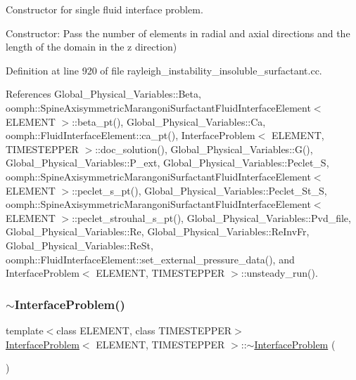 Constructor for single fluid interface problem. 

Constructor\+: Pass the number of elements in radial and axial directions and the length of the domain in the z direction) 

Definition at line 920 of file rayleigh\+\_\+instability\+\_\+insoluble\+\_\+surfactant.\+cc.



References Global\+\_\+\+Physical\+\_\+\+Variables\+::\+Beta, oomph\+::\+Spine\+Axisymmetric\+Marangoni\+Surfactant\+Fluid\+Interface\+Element$<$ E\+L\+E\+M\+E\+N\+T $>$\+::beta\+\_\+pt(), Global\+\_\+\+Physical\+\_\+\+Variables\+::\+Ca, oomph\+::\+Fluid\+Interface\+Element\+::ca\+\_\+pt(), Interface\+Problem$<$ E\+L\+E\+M\+E\+N\+T, T\+I\+M\+E\+S\+T\+E\+P\+P\+E\+R $>$\+::doc\+\_\+solution(), Global\+\_\+\+Physical\+\_\+\+Variables\+::\+G(), Global\+\_\+\+Physical\+\_\+\+Variables\+::\+P\+\_\+ext, Global\+\_\+\+Physical\+\_\+\+Variables\+::\+Peclet\+\_\+S, oomph\+::\+Spine\+Axisymmetric\+Marangoni\+Surfactant\+Fluid\+Interface\+Element$<$ E\+L\+E\+M\+E\+N\+T $>$\+::peclet\+\_\+s\+\_\+pt(), Global\+\_\+\+Physical\+\_\+\+Variables\+::\+Peclet\+\_\+\+St\+\_\+S, oomph\+::\+Spine\+Axisymmetric\+Marangoni\+Surfactant\+Fluid\+Interface\+Element$<$ E\+L\+E\+M\+E\+N\+T $>$\+::peclet\+\_\+strouhal\+\_\+s\+\_\+pt(), Global\+\_\+\+Physical\+\_\+\+Variables\+::\+Pvd\+\_\+file, Global\+\_\+\+Physical\+\_\+\+Variables\+::\+Re, Global\+\_\+\+Physical\+\_\+\+Variables\+::\+Re\+Inv\+Fr, Global\+\_\+\+Physical\+\_\+\+Variables\+::\+Re\+St, oomph\+::\+Fluid\+Interface\+Element\+::set\+\_\+external\+\_\+pressure\+\_\+data(), and Interface\+Problem$<$ E\+L\+E\+M\+E\+N\+T, T\+I\+M\+E\+S\+T\+E\+P\+P\+E\+R $>$\+::unsteady\+\_\+run().

\mbox{\label{classInterfaceProblem_a90c191f8046069099b199743e7ce7111}} 
\subsubsection{\texorpdfstring{$\sim$\+Interface\+Problem()}{~InterfaceProblem()}\hspace{0.1cm}{\footnotesize\ttfamily [1/2]}}
{\footnotesize\ttfamily template$<$class E\+L\+E\+M\+E\+NT, class T\+I\+M\+E\+S\+T\+E\+P\+P\+ER$>$ \\
\hyperlink{classInterfaceProblem}{Interface\+Problem}$<$ E\+L\+E\+M\+E\+NT, T\+I\+M\+E\+S\+T\+E\+P\+P\+ER $>$\+::$\sim$\hyperlink{classInterfaceProblem}{Interface\+Problem} (\begin{DoxyParamCaption}{ }\end{DoxyParamCaption})\hspace{0.3cm}{\ttfamily [inline]}}



